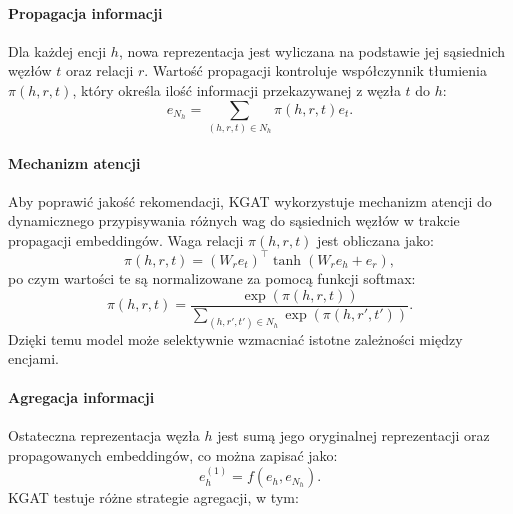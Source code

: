 \documentclass[a4paper,onecolumn]{LTJournalArticle}
\begin{document}
\paragraph{Propagacja informacji} Dla każdej encji \( h \), nowa reprezentacja jest wyliczana na podstawie jej sąsiednich węzłów \( t \) oraz relacji \( r \). Wartość propagacji kontroluje współczynnik tłumienia \( \pi(h, r, t) \), który określa ilość informacji przekazywanej z węzła \( t \) do \( h \):
\begin{equation}
    e_{N_h} = \sum_{(h,r,t) \in N_h} \pi(h, r, t) e_t.
\end{equation}

\paragraph{Mechanizm atencji} Aby poprawić jakość rekomendacji, KGAT wykorzystuje mechanizm atencji do dynamicznego przypisywania różnych wag do sąsiednich węzłów w trakcie propagacji embeddingów. Waga relacji \( \pi(h, r, t) \) jest obliczana jako:
\begin{equation}
    \pi(h, r, t) = (W_r e_t)^\top \tanh(W_r e_h + e_r),
\end{equation}
po czym wartości te są normalizowane za pomocą funkcji softmax:
\begin{equation}
    \pi(h, r, t) = \frac{\exp(\pi(h, r, t))}{\sum_{(h,r',t') \in N_h} \exp(\pi(h, r', t'))}.
\end{equation}
Dzięki temu model może selektywnie wzmacniać istotne zależności między encjami.

\paragraph{Agregacja informacji} Ostateczna reprezentacja węzła \( h \) jest sumą jego oryginalnej reprezentacji oraz propagowanych embeddingów, co można zapisać jako:
\begin{equation}
    e_h^{(1)} = f(e_h, e_{N_h}).
\end{equation}
KGAT testuje różne strategie agregacji, w tym:
\end{document}
